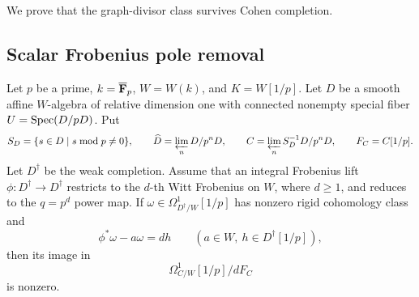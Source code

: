 We prove that the graph-divisor class survives Cohen completion.

\subsection{Scalar Frobenius pole removal}

\begin{lemma}\label{d2:lem:scalar}
Let \(p\) be a prime, \(k=\overline{\mathbf{F}}_p\), \(W=W(k)\), and
\(K=W[1/p]\).
Let \(D\) be a smooth affine \(W\)-algebra of relative dimension one
with connected nonempty special fiber \(U=\operatorname{Spec}(D/pD)\).
Put
\[
 S_D=\{s\in D\mid s\bmod p\ne0\},\qquad
 \widehat D=\varprojlim_nD/p^nD,\qquad
 C=\varprojlim_nS_D^{-1}D/p^nD,\qquad F_C=C[1/p].
\]
Let \(D^\dagger\) be the weak completion.
Assume that an integral Frobenius lift
\(\phi\colon D^\dagger\to D^\dagger\) restricts to the \(d\)-th Witt
Frobenius on \(W\), where \(d\ge1\), and reduces to the
\(q=p^d\) power map.
If \(\omega\in\Omega^1_{D^\dagger/W}[1/p]\) has nonzero rigid
cohomology class and
\[
 \phi^*\omega-a\omega=dh
 \qquad(a\in W,\ h\in D^\dagger[1/p]),
\]
then its image in
\[
 \Omega^1_{C/W}[1/p]\big/dF_C
\]
is nonzero.
\end{lemma}

